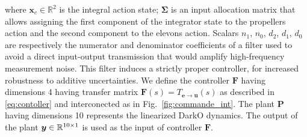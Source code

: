where $\boldsymbol{x}_{c} \in \mathbb{R}^{2}$ is the integral action state; $\boldsymbol{\Sigma}$ is an input allocation matrix that allows assigning the first component of the integrator state to the propellers action and the second component to the elevons action. Scalars $n_1$, $n_0$,  $d_2$,  $d_1$,  $d_0$ are respectively the numerator and denominator coefficients of a filter used to avoid a direct input-output transmission that would amplify high-frequency measurement noise. This filter induces a strictly proper controller, for increased robustness to additive uncertainties. We define the controller $\boldsymbol{F}$ having dimensions 4 having transfer matrix $\boldsymbol{F}(s) = T_{\boldsymbol{e} \rightarrow \boldsymbol{u}}(s)$ as described in \eqref{eq:contoller} and interconected as in Fig.~\ref{fig:commande_int}. The plant $\boldsymbol{P}$ having dimensions 10 represents the linearized DarkO dynamics. The output of the plant $\boldsymbol{y} \in {\mathbb R}^{10\times1}$ is used as the input of controller $\boldsymbol{F}$.


